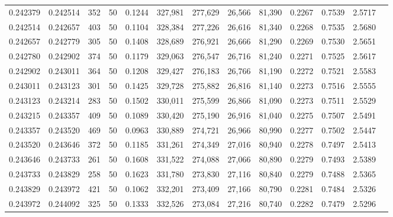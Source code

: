 \begin{tabular}{rrrrrrrrrrrrr}
0.242379 & 0.242514 &   352 &  50 &                                     0.1244 & 327,981 & 277,629 &  26,566 &  81,390 & 0.2267 & 0.7539 & 2.5717 \\
0.242514 & 0.242657 &   403 &  50 &                                     0.1104 & 328,384 & 277,226 &  26,616 &  81,340 & 0.2268 & 0.7535 & 2.5680 \\
0.242657 & 0.242779 &   305 &  50 &                                     0.1408 & 328,689 & 276,921 &  26,666 &  81,290 & 0.2269 & 0.7530 & 2.5651 \\
0.242780 & 0.242902 &   374 &  50 &                                     0.1179 & 329,063 & 276,547 &  26,716 &  81,240 & 0.2271 & 0.7525 & 2.5617 \\
0.242902 & 0.243011 &   364 &  50 &                                     0.1208 & 329,427 & 276,183 &  26,766 &  81,190 & 0.2272 & 0.7521 & 2.5583 \\
0.243011 & 0.243123 &   301 &  50 &                                     0.1425 & 329,728 & 275,882 &  26,816 &  81,140 & 0.2273 & 0.7516 & 2.5555 \\
0.243123 & 0.243214 &   283 &  50 &                                     0.1502 & 330,011 & 275,599 &  26,866 &  81,090 & 0.2273 & 0.7511 & 2.5529 \\
0.243215 & 0.243357 &   409 &  50 &                                     0.1089 & 330,420 & 275,190 &  26,916 &  81,040 & 0.2275 & 0.7507 & 2.5491 \\
0.243357 & 0.243520 &   469 &  50 &                                     0.0963 & 330,889 & 274,721 &  26,966 &  80,990 & 0.2277 & 0.7502 & 2.5447 \\
0.243520 & 0.243646 &   372 &  50 &                                     0.1185 & 331,261 & 274,349 &  27,016 &  80,940 & 0.2278 & 0.7497 & 2.5413 \\
0.243646 & 0.243733 &   261 &  50 &                                     0.1608 & 331,522 & 274,088 &  27,066 &  80,890 & 0.2279 & 0.7493 & 2.5389 \\
0.243733 & 0.243829 &   258 &  50 &                                     0.1623 & 331,780 & 273,830 &  27,116 &  80,840 & 0.2279 & 0.7488 & 2.5365 \\
0.243829 & 0.243972 &   421 &  50 &                                     0.1062 & 332,201 & 273,409 &  27,166 &  80,790 & 0.2281 & 0.7484 & 2.5326 \\
0.243972 & 0.244092 &   325 &  50 &                                     0.1333 & 332,526 & 273,084 &  27,216 &  80,740 & 0.2282 & 0.7479 & 2.5296 \\

\end{tabular}
